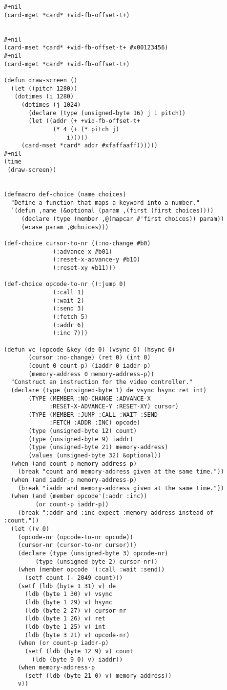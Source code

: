 \documentclass[%
  DIV19]{scrartcl}
\begin{document}
\begin{lstlisting}[label=some-code,caption=SBCL Code to talk to graphics card]
#+nil
(card-mget *card* +vid-fb-offset-t+)


#+nil
(card-mset *card* +vid-fb-offset-t+ #x00123456)
#+nil
(card-mget *card* +vid-fb-offset-t+)

(defun draw-screen ()
  (let ((pitch 1280))
   (dotimes (i 1280)
     (dotimes (j 1024)
       (declare (type (unsigned-byte 16) j i pitch))
       (let ((addr (+ +vid-fb-offset-t+
		      (* 4 (+ (* pitch j)
			      i)))))
	 (card-mset *card* addr #xfaffaaff))))))
#+nil
(time
 (draw-screen))


(defmacro def-choice (name choices)
  "Define a function that maps a keyword into a number."
  `(defun ,name (&optional (param ,(first (first choices))))
     (declare (type (member ,@(mapcar #'first choices)) param))
     (ecase param ,@choices)))

(def-choice cursor-to-nr ((:no-change #b0)
			  (:advance-x #b01)
			  (:reset-x-advance-y #b10)
			  (:reset-xy #b11)))

(def-choice opcode-to-nr ((:jump 0)
			  (:call 1)
			  (:wait 2)
			  (:send 3)
			  (:fetch 5)
			  (:addr 6)
			  (:inc 7)))

(defun vc (opcode &key (de 0) (vsync 0) (hsync 0)
	   (cursor :no-change) (ret 0) (int 0) 
	   (count 0 count-p) (iaddr 0 iaddr-p) 
	   (memory-address 0 memory-address-p))
  "Construct an instruction for the video controller."
  (declare (type (unsigned-byte 1) de vsync hsync ret int)
	   (TYPE (MEMBER :NO-CHANGE :ADVANCE-X
			 :RESET-X-ADVANCE-Y :RESET-XY) cursor)
	   (TYPE (MEMBER :JUMP :CALL :WAIT :SEND 
			 :FETCH :ADDR :INC) opcode)
	   (type (unsigned-byte 12) count)
	   (type (unsigned-byte 9) iaddr)
	   (type (unsigned-byte 21) memory-address)
	   (values (unsigned-byte 32) &optional))
  (when (and count-p memory-address-p)
    (break "count and memory-address given at the same time."))
  (when (and iaddr-p memory-address-p)
    (break "iaddr and memory-address given at the same time."))
  (when (and (member opcode'(:addr :inc))
	     (or count-p iaddr-p))
    (break ":addr and :inc expect :memory-address instead of :count."))
  (let ((v 0)
	(opcode-nr (opcode-to-nr opcode))
	(cursor-nr (cursor-to-nr cursor)))
    (declare (type (unsigned-byte 3) opcode-nr)
	     (type (unsigned-byte 2) cursor-nr))
    (when (member opcode '(:call :wait :send))
      (setf count (- 2049 count)))
    (setf (ldb (byte 1 31) v) de
	  (ldb (byte 1 30) v) vsync 
	  (ldb (byte 1 29) v) hsync
	  (ldb (byte 2 27) v) cursor-nr
	  (ldb (byte 1 26) v) ret
	  (ldb (byte 1 25) v) int
	  (ldb (byte 3 21) v) opcode-nr)
    (when (or count-p iaddr-p)
      (setf (ldb (byte 12 9) v) count
	    (ldb (byte 9 0) v) iaddr))
    (when memory-address-p
      (setf (ldb (byte 21 0) v) memory-address))
    v))


\end{lstlisting}
\end{document}
